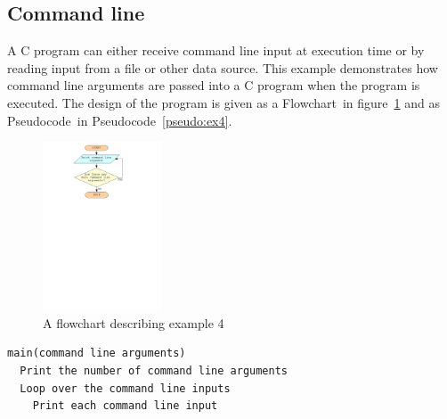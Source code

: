 \documentclass[11pt]{scrartcl}
\def\psc{Pseudocode}
\def\flo{Flowchart}
\begin{document}
\subsection{Command line}
A C program can either receive command line input at execution time or
by reading input from a file or other data source.  This example
demonstrates how command line arguments are passed into a C program
when the program is executed.  The design of the program is given as a
\flo\ in figure~\ref{figure:flowchart_ex4} and as \psc\ in
\psc~\ref{pseudo:ex4}. 

\begin{figure}[h]
\begin{center}
\includegraphics[height=5cm]{figures/ex4}
\caption{A flowchart describing example 4
\label{figure:flowchart_ex4}}
\end{center}
\end{figure}

\begin{pseudocode}[h]
\begin{verbatim}
main(command line arguments)
  Print the number of command line arguments
  Loop over the command line inputs
    Print each command line input
\end{verbatim}
\caption{Example 4 in pseudocode \label{pseudo:ex4}}
\end{pseudocode}
\end{document}
